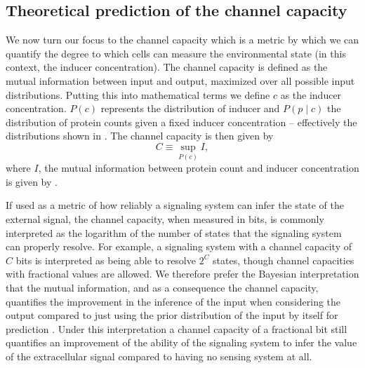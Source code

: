 \subsection{Theoretical prediction of the channel capacity}
\label{sec_channcap}

We now turn our focus to the channel capacity which is a metric by which we can
quantify the degree to which cells can measure the environmental state (in this
context, the inducer concentration). The channel capacity is defined as the
mutual information between input and output, maximized over all possible input
distributions. Putting this into mathematical terms we define $c$ as the
inducer concentration. $P(c)$ represents the distribution of inducer and $P(p
\mid c)$ the distribution of protein counts given a fixed inducer concentration
-- effectively the distributions shown in . The channel
capacity is then given by
\begin{equation}
  C \equiv \sup_{P(c)} I,
  \label{eq_chann_cap}
\end{equation}
where $I$, the mutual information between protein count and inducer
concentration is given by .

If used as a metric of how reliably a signaling system can infer the state of
the external signal, the channel capacity, when measured in bits, is commonly
interpreted as the logarithm of the number of states that the signaling system
can properly resolve. For example, a signaling system with a channel capacity
of $C$ bits is interpreted as being able to resolve $2^C$ states, though
channel capacities with fractional values are allowed. We therefore prefer
the Bayesian interpretation that the mutual information, and as a consequence
the channel capacity, quantifies the improvement in the inference of the input
when considering the output compared to just using the prior distribution of
the input by itself for prediction \cite{Voliotis2014a, Bowsher2014}. Under
this interpretation a channel capacity of a fractional bit still quantifies an
improvement of the ability of the signaling system to infer the value of the
extracellular signal compared to having no sensing system at all.

